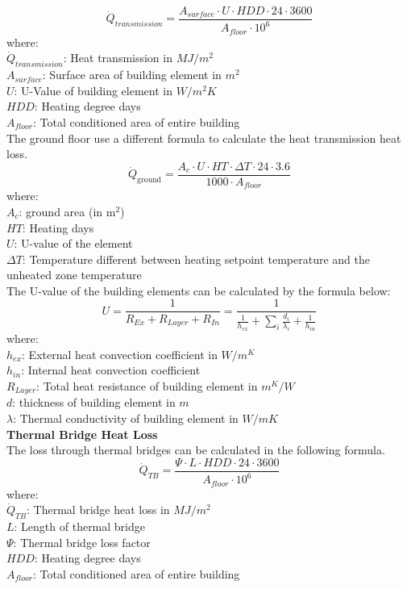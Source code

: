 \documentclass[a4paper, oneside]{discothesis}
\begin{document}
		\[\dot{Q}_{transmission} =\frac{ A_{surface} \cdot U \cdot HDD \cdot 24 \cdot 3600}{A_{floor} \cdot 10^6}\]
		where:\\
		$\dot{Q}_{transmission}$: Heat transmission in $MJ/m^2$\\
		$A_{surface}$: Surface area of building element in $m^2$\\
		$U$: U-Value of building element in $ W/m^2K$\\
		$HDD$: Heating degree days\\
		$A_{floor}$: Total conditioned area of entire building\\

		The ground floor use a different formula to calculate the heat transmission heat loss.
		\[\dot{Q}_{\text{ground}} = \frac{ A_{c} \cdot U \cdot HT \cdot \Delta T \cdot 24 \cdot 3.6}{1000 \cdot A_{floor}}\]
		where:\\
		$A_c$: ground area (in m$^2$)\\
		$HT$: Heating days\\
		$U$: U-value of the element\\
		$\Delta T$: Temperature different between heating setpoint temperature and the unheated zone temperature\\

		The U-value of the building elements can be calculated by the formula below: \\
		\[U = \frac{1}{R_{Ex}+R_{Layer}+R_{In}} = \frac{1}{\frac{1}{h_{ex}}+\sum_{i}\frac{d_i}{\lambda_i} + \frac{1}{h_{in}}}\]
		where:\\
		$h_{ex}$: External heat convection coefficient in $W/m^K$\\
		$h_{in}$: Internal heat convection coefficient\\
		$R_{Layer}$: Total heat resistance of building element in $m^K/W$\\
		$d$: thickness of building element in $m$\\
		$\lambda$: Thermal conductivity of building element in $W/mK$\\


	\textbf{Thermal Bridge Heat Loss}\\
		The loss through thermal bridges can be calculated in the following formula.\\
		\[\dot{Q}_{TB} = \frac{\Psi \cdot L \cdot HDD \cdot 24 \cdot 3600}{A_{floor} \cdot 10^6}\]
		where:\\
		$\dot{Q}_{TB}$: Thermal bridge heat loss in $MJ/m^2$\\
		$L$: Length of thermal bridge\\
		$\Psi$: Thermal bridge loss factor\\ 
		$HDD$: Heating degree days\\
		$A_{floor}$: Total conditioned area of entire building\\
\end{document}
